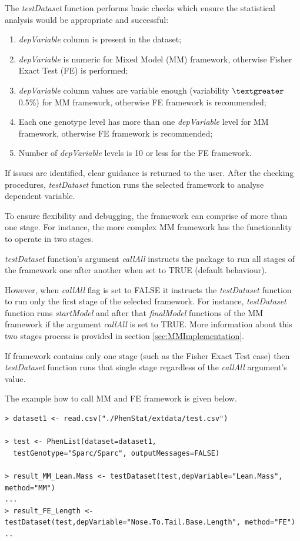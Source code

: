 \documentclass[12pt,a4paper]{article}
\begin{document}
The \textit{testDataset} function performs basic checks which ensure the statistical analysis would be appropriate and successful:
\begin{enumerate}
\item \textit{depVariable} column is present in the dataset;
\item \textit{depVariable} is numeric for Mixed Model (MM) framework, otherwise Fisher Exact Test (FE) is performed;
\item \textit{depVariable} column values are variable enough (variability $\textgreater$ 0.5\%) for MM framework, otherwise  FE framework is recommended;
\item Each one genotype level has more than one \textit{depVariable} level for MM framework, otherwise FE framework is recommended;
\item Number of \textit{depVariable} levels is 10 or less for the FE framework.
\end{enumerate}

If issues are identified, clear guidance is returned to the user. 
After the checking procedures, \textit{testDataset} function runs the selected framework to analyse dependent variable. 

To ensure flexibility and debugging, the framework can comprise of more than one stage. For instance, the more complex MM framework has the functionality to operate in two stages.

\textit{testDataset} function's argument \textit{callAll} instructs the package to run all stages of the framework one after another when set to TRUE (default behaviour). 

However, when \textit{callAll} flag is set to FALSE it instructs the \textit{testDataset} function to run only the first stage of the selected framework.
For instance, \textit{testDataset} function runs \textit{startModel} and after that \textit{finalModel} functions of the MM framework if the argument \textit{callAll} is set to TRUE.  More information about this two stages process is provided in section \ref{sec:MMImplementation}.

If framework contains only one stage (such as the Fisher Exact Test case) then \textit{testDataset} function runs that single stage regardless of the \textit{callAll} argument's value. 

The example how to call MM and FE framework is given below.
\begingroup
    \fontsize{8pt}{12pt}\selectfont
\begin{verbatim}
> dataset1 <- read.csv("./PhenStat/extdata/test.csv")

> test <- PhenList(dataset=dataset1,
  testGenotype="Sparc/Sparc", outputMessages=FALSE)

> result_MM_Lean.Mass <- testDataset(test,depVariable="Lean.Mass", method="MM")
...
> result_FE_Length <- testDataset(test,depVariable="Nose.To.Tail.Base.Length", method="FE")
..
\end{verbatim}
\endgroup
\end{document}
